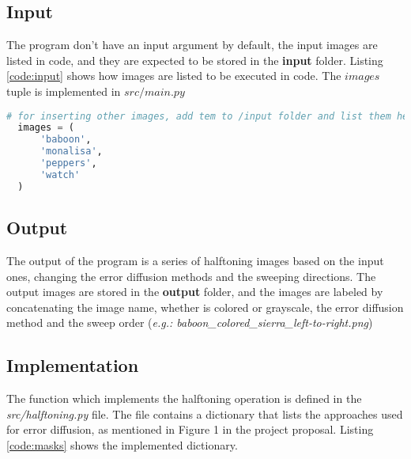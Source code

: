 \documentclass[]{IEEEtran}
\begin{document}
\subsection{Input}

The program don't have an input argument by default, the input images are listed in code, and they are expected to be stored in the \textbf{input} folder. Listing \ref{code:input} shows how images are listed to be executed in code. The $images$ tuple is implemented in $src/main.py$

\begin{lstlisting}[language=Python, caption={Input images inside code}, label={code:input}]
  # for inserting other images, add tem to /input folder and list them here
  images = (
      'baboon',
      'monalisa',
      'peppers',
      'watch'
  )
\end{lstlisting}

\subsection{Output}
The output of the program is a series of halftoning images based on the input ones, changing the error diffusion methods and the sweeping directions. The output images are stored in the \textbf{output} folder, and the images are labeled by concatenating the image name, whether is colored or grayscale, the error diffusion method and the sweep order (\textit{e.g.: baboon\_colored\_sierra\_left-to-right.png})

\subsection{Implementation}
The function which implements the halftoning operation is defined in the \textit{src/halftoning.py} file. The file contains a dictionary that lists the approaches used for error diffusion, as mentioned in Figure 1 in the project proposal. Listing \ref{code:masks} shows the implemented dictionary.
\end{document}
